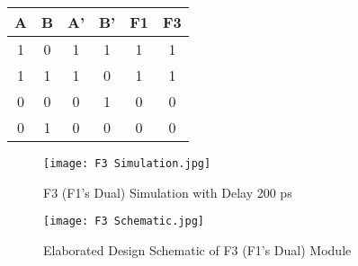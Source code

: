 \documentclass[pdftex,12pt,a4paper]{article}
\begin{document}
\begin{center}
 \begin{tabular}{|c|c|c|c|c|c|} 
 \hline
 A & B & A' & B' & F1 & F3 \\ 
 \hline\hline
 1 & 0 & 1 & 1 & 1 & 1 \\ 
 \hline
 1 & 1 & 1 & 0 & 1 & 1 \\
 \hline
 0 & 0 & 0 & 1 & 0 & 0 \\
 \hline
 0 & 1 & 0 & 0 & 0 & 0 \\
 \hline
\end{tabular}
\end{center}
\begin{figure}[ht]
	\centering
	\texttt{[image: F3 Simulation.jpg]}	
	\caption{F3 (F1's Dual) Simulation with Delay 200 ps}
	\label{fig1}
\end{figure}
\begin{figure}[ht]
	\centering
	\texttt{[image: F3 Schematic.jpg]}	
	\caption{Elaborated Design Schematic of F3 (F1's Dual) Module}
	\label{fig1}
\end{figure}

\newpage
\end{document}
